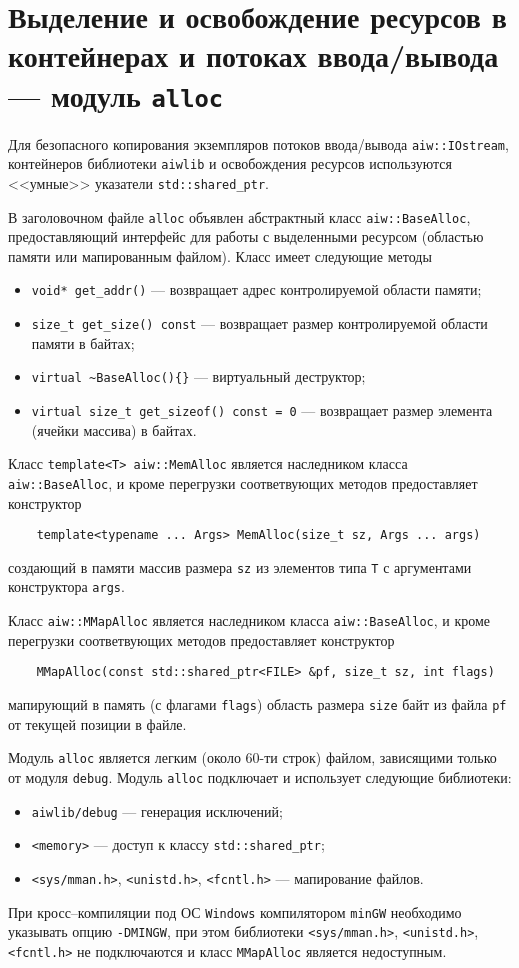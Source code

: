\section{Выделение и освобождение ресурсов  в контейнерах и потоках ввода/вывода --- модуль {\tt alloc}}
Для безопасного копирования экземпляров потоков ввода/вывода \verb'aiw::IOstream', контейнеров библиотеки
\verb'aiwlib' и освобождения ресурсов используются <<умные>> указатели \verb'std::shared_ptr'.

В заголовочном файле \verb'alloc' объявлен абстрактный класс \verb'aiw::BaseAlloc',
предоставляющий интерфейс для работы с выделенными ресурсом (областью памяти или мапированным файлом).
Класс имеет следующие методы
\begin{itemize}
\item \verb'void* get_addr()' --- возвращает адрес контролируемой области памяти;
\item \verb'size_t get_size() const'  --- возвращает размер контролируемой области памяти в байтах;
\item \verb'virtual ~BaseAlloc(){}' --- виртуальный деструктор;
\item \verb'virtual size_t get_sizeof() const = 0' --- возвращает размер элемента (ячейки массива) в байтах.
\end{itemize}

Класс \verb'template<T> aiw::MemAlloc' является наследником класса \verb'aiw::BaseAlloc',
и кроме перегрузки соответвующих методов предоставляет конструктор
\begin{verbatim}
    template<typename ... Args> MemAlloc(size_t sz, Args ... args)
\end{verbatim}
создающий в памяти массив размера \verb'sz' из элементов типа \verb'T' с аргументами конструктора \verb'args'.

Класс \verb'aiw::MMapAlloc' является наследником класса \verb'aiw::BaseAlloc',
и кроме перегрузки соответвующих методов предоставляет конструктор
\begin{verbatim}
    MMapAlloc(const std::shared_ptr<FILE> &pf, size_t sz, int flags)
\end{verbatim}
мапирующий в память (с флагами \verb'flags') область размера \verb'size' байт из файла \verb'pf' от текущей позиции в файле.

Модуль \verb'alloc' является легким (около 60-ти строк) файлом, зависящими только от модуля \verb'debug'.
Модуль \verb'alloc' подключает и использует следующие библиотеки:
\begin{itemize}
\item \verb'aiwlib/debug' --- генерация исключений;
\item \verb'<memory>' --- доступ к классу \verb'std::shared_ptr';
\item \verb'<sys/mman.h>', \verb'<unistd.h>', \verb'<fcntl.h>' --- мапирование файлов.  
\end{itemize}

При кросс--компиляции под ОС \verb'Windows' компилятором \verb'minGW' необходимо указывать опцию \verb'-DMINGW',
при этом библиотеки \verb'<sys/mman.h>', \verb'<unistd.h>', \verb'<fcntl.h>' не подключаются и
класс \verb'MMapAlloc' является недоступным.

